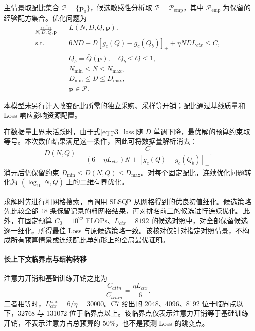 \documentclass[bwprint]{gmcmthesis}
\numberwithin{equation}{section}
\numberwithin{figure}{section}
\numberwithin{table}{section}
\begin{document}
        主情景取配比集合 $\mathcal P=\{\bm p_0\}$，候选敏感性分析取 $\mathcal P=\mathcal P_{\mathrm{emp}}$，其中 $\mathcal P_{\mathrm{emp}}$ 为保留的经验配方集合。优化问题为
        \begin{equation}
        \begin{aligned}
        \min_{N,D,Q,\bm p}\quad &L(N,D,Q,\bm p),\\
        \mathrm{s.t.}\quad
        &6ND+D[g_c(Q)-g_c(Q_b)]_++\eta NDL_{ctx}\le C,\\
        &Q_b=\bar Q(\bm p),\quad Q_b\le Q\le1,\\
        &N_{\min}\le N\le N_{\max},\\
        &D_{\min}\le D\le D_{\max},\\
        &\bm p\in\mathcal P.
        \end{aligned}
        \label{eq:p3_optimization}
        \end{equation}

        本模型未另行计入改变配比所需的独立采购、采样等开销；配比通过基线质量和 Loss 响应影响资源配置。

        在数据量上界未活跃时，由于式\eqref{eq:p3_loss}随 $D$ 单调下降，最优解的预算约束取等号。本次数值结果满足这一条件，因此可将数据量解析消去：
        \begin{equation}
        D(N,Q)=\frac{C}{(6+\eta L_{ctx})N+[g_c(Q)-g_c(Q_b)]_+}.
        \label{eq:p3_eliminate_d}
        \end{equation}
        消元后仍保留约束 $D_{\min}\le D(N,Q)\le D_{\max}$。对每个固定配比，连续优化问题转化为 $(\log_{10}N,Q)$ 上的二维有界优化。

        求解时先进行粗网格搜索，再调用 SLSQP 从网格得到的优良初值细化\textsuperscript{\cite{virtanen2020scipy}}。候选策略先比较全部 48 条保留记录的粗网格结果，再对排名前三的候选进行连续优化。此外，在固定预算 $C_0=10^{22}$ FLOPs、$L_{ctx}=8192$ 的候选对照中，对全部保留候选逐一细化，所得最佳 Loss 与原候选策略一致。该核对仅针对指定对照情景，不构成所有预算情景或连续配比单纯形上的全局最优证明。

        \paragraph{长上下文临界点与结构转移}

        注意力开销和基础训练开销之比为
        \begin{equation}
        \frac{C_{attn}}{C_{train}}=\frac{\eta L_{ctx}}{6}.
        \label{eq:p3_attention_ratio}
        \end{equation}
        二者相等时，$L_{ctx}^{crit}=6/\eta=30000$。C7 给出的 2048、4096、8192 位于临界点以下，32768 与 131072 位于临界点以上。该临界点仅表示注意力开销等于基础训练开销，不表示注意力占总预算的 $50\%$，也不是预测 Loss 的跳变点。
\end{document}
